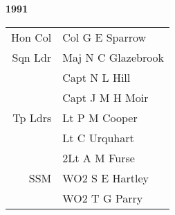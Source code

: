 \begin{center}
  \Huge
  \textbf{1991}
\end{center}

\begin{center}
  \small
  \begin{tabular}{rl}
    Hon Col & Col G E Sparrow \\
    Sqn Ldr & Maj N C Glazebrook \\
      & Capt N L Hill \\
      & Capt J M H Moir \\
    Tp Ldrs & Lt P M Cooper \\
      & Lt C Urquhart \\
      & 2Lt A M Furse \\
    SSM & WO2 S E Hartley \\
      & WO2 T G Parry \\
  \end{tabular}
\end{center}

